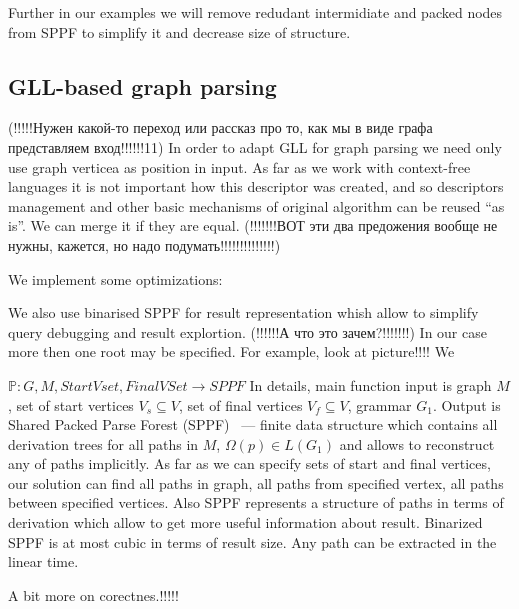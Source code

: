 Further in our examples we will remove redudant intermidiate and packed nodes from SPPF to simplify it and decrease size of structure.

\subsection{GLL-based graph parsing}
(!!!!!Нужен какой-то переход или рассказ про то, как мы в виде графа представляем вход!!!!!!11)
In order to adapt GLL for graph parsing we need only use graph verticea as position in input.
As far as we work with context-free languages it is not important how this descriptor was created, and so descriptors management and other basic mechanisms of original algorithm can be reused ``as is''. 
We can merge it if they are equal. (!!!!!!!ВОТ эти два предожения вообще не нужны, кажется, но надо подумать!!!!!!!!!!!!!!) 

We implement some optimizations:~\cite{FastPracticalGLL}

We also use binarised SPPF for result representation whish allow to simplify query debugging and result explortion. (!!!!!!А что это  зачем?!!!!!!!)
In our case more then one root may be specified. For example, look at picture!!!! 
We 

$\mathbb{P}:G, M, StartVset, FinalVSet \rightarrow SPPF$
In details, main function input is graph $M$, set of start vertices $V_s\subseteq V$, set of final vertices $V_f\subseteq V$, grammar $G_1$.
Output is Shared Packed Parse Forest (SPPF)~\cite{SPPF} --- finite data structure which contains all derivation trees for all paths in $M$, $\Omega(p) \in L(G_1)$ and allows to reconstruct any of paths implicitly.
As far as we can specify sets of start and final vertices, our solution can find all paths in graph, all paths from specified vertex, all paths between specified vertices. 
Also SPPF represents a structure of paths in terms of derivation which allow to get more useful 
information about result. 
Binarized SPPF is at most cubic in terms of result size. 
Any path can be extracted in the linear time.

A bit more on corectnes.!!!!!
